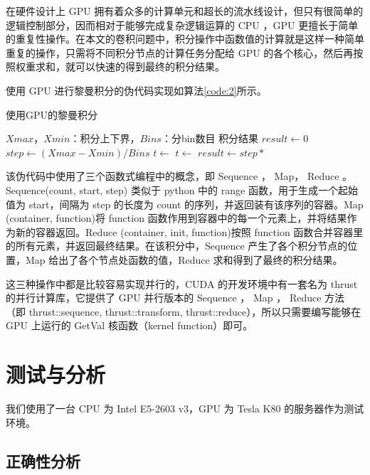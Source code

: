 在硬件设计上 GPU 拥有着众多的计算单元和超长的流水线设计，但只有很简单的逻辑控制部分，因而相对于能够完成复杂逻辑运算的 CPU ，GPU 更擅长于简单的重复性操作。在本文的卷积问题中，积分操作中函数值的计算就是这样一种简单重复的操作，只需将不同积分节点的计算任务分配给 GPU 的各个核心，然后再按照权重求和，就可以快速的得到最终的积分结果。

使用 GPU 进行黎曼积分的伪代码实现如算法\ref{code:2}所示。
\begin{algorithm}  
    \caption{使用GPU的黎曼积分}  
    \begin{algorithmic}[1] 
        \Require 
            $Xmax$，$Xmin$：积分上下界，$Bins$：分bin数目
        \Ensure 
            积分结果
            \State $result \gets 0$  
            \State $step \gets (Xmax - Xmin) / Bins$
            \State $t \gets $
            \State $t \gets $
            \State $result \gets step * $
            \State {}
        \EndFunction

    \end{algorithmic}  
    \label{code:2}
\end{algorithm} 
该伪代码中使用了三个函数式编程中的概念，即 Sequence ， Map， Reduce 。 Sequence(count, start, step) 类似于 python 中的 range 函数，用于生成一个起始值为 start，间隔为 step 的长度为 count 的序列，并返回装有该序列的容器。Map (container, function)将 function 函数作用到容器中的每一个元素上，并将结果作为新的容器返回。Reduce (container, init, function)按照 function 函数合并容器里的所有元素，并返回最终结果。在该积分中，Sequence 产生了各个积分节点的位置，Map 给出了各个节点处函数的值，Reduce 求和得到了最终的积分结果。

这三种操作中都是比较容易实现并行的，CUDA 的开发环境中有一套名为 thrust 的并行计算库\supercite{thrust}，它提供了 GPU 并行版本的 Sequence ， Map ， Reduce 方法（即 thrust::sequence, thrust::transform, thrust::reduce），所以只需要编写能够在 GPU 上运行的 GetVal 核函数（kernel function）即可。

\section{测试与分析}

我们使用了一台 CPU 为 Intel E5-2603 v3，GPU 为 Tesla K80 的服务器作为测试环境。

\subsection{正确性分析}


